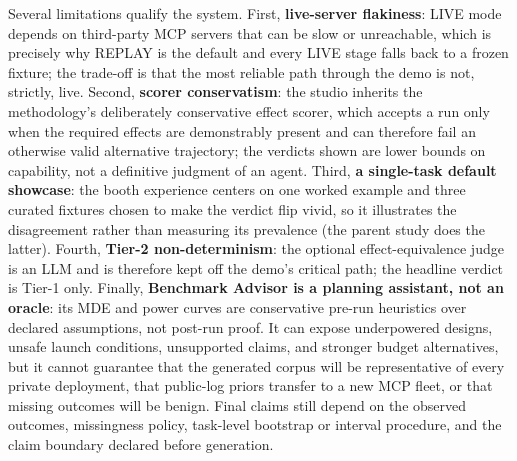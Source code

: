 \documentclass[11pt]{article}
\begin{document}
Several limitations qualify the system. First, \textbf{live-server flakiness}:
LIVE mode depends on third-party MCP servers that can be slow or unreachable,
which is precisely why REPLAY is the default and every LIVE stage falls back to
a frozen fixture; the trade-off is that the most reliable path through the demo
is not, strictly, live. Second, \textbf{scorer conservatism}: the studio inherits
the methodology's deliberately conservative effect scorer, which accepts a run
only when the required effects are demonstrably present and can therefore fail
an otherwise valid alternative trajectory; the verdicts shown are lower bounds
on capability, not a definitive judgment of an agent. Third, \textbf{a
single-task default showcase}: the booth experience centers on one worked
example and three curated fixtures chosen to make the verdict flip vivid, so it
illustrates the disagreement rather than measuring its prevalence (the parent
study does the latter). Fourth, \textbf{Tier-2 non-determinism}: the optional
effect-equivalence judge is an LLM and is therefore kept off the demo's critical
path; the headline verdict is Tier-1 only. Finally, \textbf{Benchmark Advisor is
a planning assistant, not an oracle}: its MDE and power curves are conservative
pre-run heuristics over declared assumptions, not post-run proof. It can expose
underpowered designs, unsafe launch conditions, unsupported claims, and stronger
budget alternatives, but it cannot guarantee that the generated corpus will be
representative of every private deployment, that public-log priors transfer to a
new MCP fleet, or that missing outcomes will be benign. Final claims still
depend on the observed outcomes, missingness policy, task-level bootstrap or
interval procedure, and the claim boundary declared before generation.






\end{document}
